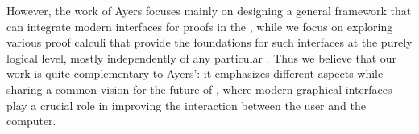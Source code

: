 However, the work of Ayers focuses mainly on designing a general framework that
can integrate modern interfaces for proofs in the  , while we
focus on exploring various proof calculi that provide the foundations for such
interfaces at the purely logical level, mostly independently of any particular
. Thus we believe that our work is quite complementary to Ayers':
it emphasizes different aspects while sharing a common vision for the future of
, where modern graphical interfaces play a crucial role in
improving the interaction between the user and the computer.
